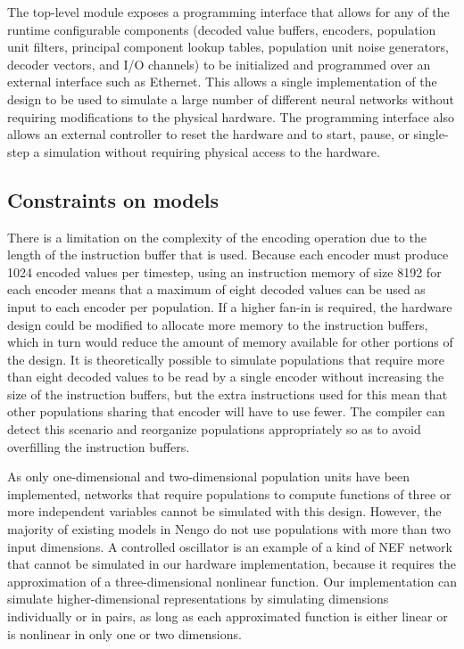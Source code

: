 \documentclass[english]{article}
\begin{document}
The top-level module exposes a programming interface that allows for any of the runtime configurable components
(decoded value buffers, encoders, population unit filters, principal component lookup tables,
population unit noise generators, decoder vectors, and I/O channels) to be initialized and programmed
over an external interface such as Ethernet. This allows a single implementation of the design
to be used to simulate a large number of different neural networks without requiring modifications to the physical hardware.
The programming interface also allows an external controller to reset the hardware and to start, pause, or single-step a simulation
without requiring physical access to the hardware.

\subsection{Constraints on models}

There is a limitation on the complexity of the encoding operation due to the length of the instruction buffer that is used.
Because each encoder must produce 1024 encoded values per timestep, using an instruction memory of size 8192 for each encoder means that a maximum of eight decoded values
can be used as input to each encoder per population.
If a higher fan-in is required, the hardware design could be modified to allocate more memory to the instruction buffers,
which in turn would reduce the amount of memory available for other portions of the design.
It is theoretically possible to simulate populations that require more than eight decoded values to be read by a single encoder
without increasing the size of the instruction buffers,
but the extra instructions used for this mean that other populations sharing that encoder will have to use fewer.
The compiler can detect this scenario and reorganize populations appropriately so as to avoid overfilling the instruction buffers.

As only one-dimensional and two-dimensional population units have been implemented, networks that require populations to compute functions
of three or more independent variables cannot be simulated with this design.
However, the majority of existing models in Nengo do not use populations with more than two input dimensions.
A controlled oscillator is an example of a kind of NEF network that cannot be simulated in our hardware implementation,
because it requires the approximation of a three-dimensional nonlinear function. Our implementation can simulate higher-dimensional representations
by simulating dimensions individually or in pairs, as long as each approximated function is either linear or is nonlinear in only one or two dimensions.
\end{document}
